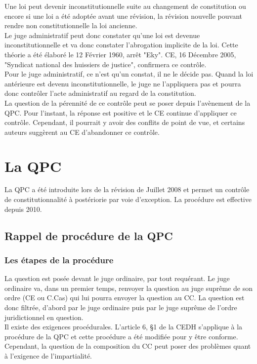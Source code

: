 \documentclass[10pt, a4paper, openany]{book}
\begin{document}
Une loi peut devenir inconstitutionnelle suite au changement de constitution ou encore si une loi a été adoptée avant une révision, la révision nouvelle pouvant rendre non constitutionnelle la loi ancienne. \\
Le juge administratif peut donc constater qu'une loi est devenue inconstitutionnelle et va donc constater l'abrogation implicite de la loi. Cette théorie a été élaboré le 12 Février 1960, arrêt "Eky". CE, 16 Décembre 2005, "Syndicat national des huissiers de justice", confirmera ce contrôle. \\
Pour le juge administratif, ce n'est qu'un constat, il ne le décide pas. Quand la loi antérieure est devenu inconstitutionnelle, le juge ne l'appliquera pas et pourra donc contrôler l'acte administratif au regard de la constitution. \\
La question de la pérennité de ce contrôle peut se poser depuis l'avènement de la QPC. Pour l'instant, la réponse est positive et le CE continue d'appliquer ce contrôle. Cependant, il pourrait y avoir des conflits de point de vue, et certains auteurs suggèrent au CE d'abandonner ce contrôle.

\section{La QPC}

La QPC a été introduite lors de la révision de Juillet 2008 et permet un contrôle de constitutionnalité à postériorie par voie d'exception. La procédure est effective depuis 2010.


\subsection{Rappel de procédure de la QPC}

\subsubsection{Les étapes de la procédure}

La question est posée devant le juge ordinaire, par tout requérant. Le juge ordinaire va, dans un premier temps, renvoyer la question au juge suprême de son ordre (CE ou C.Cas) qui lui pourra envoyer la question au CC. La question est donc filtrée, d'abord par le juge ordinaire puis par le juge suprême de l'ordre juridictionnel en question. \\
Il existe des exigences procédurales. L'article 6, §1 de la CEDH s'applique à la procédure de la QPC et cette procédure a été modifiée pour y être conforme. Cependant, la question de la composition du CC peut poser des problèmes quant à l'exigence de l'impartialité. 
\end{document}
